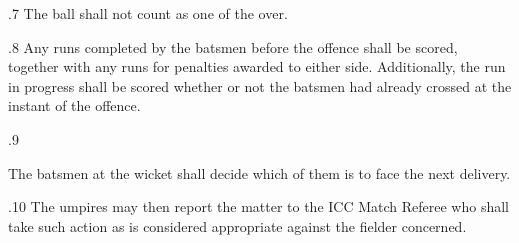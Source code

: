 \documentclass[12pt]{article}
\begin{document}
\vspace{\baselineskip}
{\fontsize{9pt}{10.8pt}.7 \tabto{0.49in} The ball shall not count as one of the over.\par}\par


\vspace{\baselineskip}
\begin{adjustwidth}{0.5in}{0.07in}
{\fontsize{9pt}{10.8pt}.8 \tabto{0.49in} Any runs completed by the batsmen before the offence shall be scored, together with any runs for penalties awarded to either side. Additionally, the run in progress shall be scored whether or not the batsmen had already crossed at the instant of the offence.\par}\par

\end{adjustwidth}


\vspace{\baselineskip}
{\fontsize{9pt}{10.8pt}.9 \tabto{0.49in} {\fontsize{8pt}{9.6pt}\selectfont The batsmen at the wicket shall decide which of them is to face the next delivery.\par}\par}\par


\vspace{\baselineskip}

\vspace{\baselineskip}

\vspace{\baselineskip}

\vspace{\baselineskip}

\vspace{\baselineskip}

\vspace{\baselineskip}
\begin{Center}
{\fontsize{8pt}{9.6pt}\par}
\end{Center}\par


\vspace{\baselineskip}

\vspace{\baselineskip}
\begin{adjustwidth}{0.5in}{0.57in}
{\fontsize{9pt}{10.8pt}.10 The umpires may then report the matter to the ICC Match Referee who shall take such action as is considered appropriate against the fielder concerned.\par}\par

\end{adjustwidth}
\end{document}
